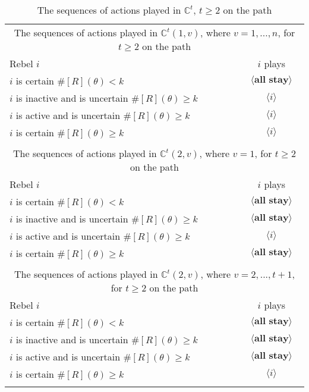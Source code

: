 \documentclass[12pt,letter]{article}
\newcommand{\Kappa}{\mathbb{C}}
\theoremstyle{definition}
\theoremstyle{definition}
\theoremstyle{remark}
\theoremstyle{claim}
\begin{document}
\begin{table}[!htbp]
\caption{The sequences of actions played in $\Kappa^t$, $t\geq 2$ on the path}
\label{Table_cdt}
\begin{center}
\begin{tabular}{l c}
\multicolumn{2}{c}{The sequences of actions played in $\Kappa^t(1,v)$, where $v=1,...,n$, for $t\geq 2$ on the path}\\
Rebel $i$ 	 	&  	$i$ plays		 \\
\hline
\hline
$i$ is certain $\#[R](\theta)<k$ 	& 	$\langle \textbf{all stay} \rangle$	\\
$i$ is inactive and is uncertain $\#[R](\theta)\geq k$	& 	$\langle i \rangle$	\\
$i$ is active and is uncertain $\#[R](\theta)\geq k$ &  $\langle i \rangle$  \\
$i$ is certain $\#[R](\theta)\geq k$ &  $\langle i \rangle$  \\
\hline
\\
\multicolumn{2}{c}{The sequences of actions played in $\Kappa^t(2,v)$, where $v=1$, for $t\geq 2$ on the path}\\
Rebel $i$ 	 	&  	$i$ plays		 \\
\hline
\hline
$i$ is certain $\#[R](\theta)<k$ 	& 	$\langle \textbf{all stay} \rangle$	\\
$i$ is inactive and is uncertain $\#[R](\theta)\geq k$	& 	$\langle \textbf{all stay} \rangle$	\\
$i$ is active and is uncertain $\#[R](\theta)\geq k$ &  $\langle i \rangle$  \\
$i$ is certain $\#[R](\theta)\geq k$ &  $\langle \textbf{all stay} \rangle$  \\
\hline
\\
\multicolumn{2}{c}{The sequences of actions played in $\Kappa^t(2,v)$, where $v=2,...,t+1$, for $t\geq 2$ on the path}\\
Rebel $i$ 	 	&  	$i$ plays		 \\
\hline
\hline
$i$ is certain $\#[R](\theta)<k$ 	& 	$\langle \textbf{all stay} \rangle$	\\
$i$ is inactive and is uncertain $\#[R](\theta)\geq k$	& 	$\langle \textbf{all stay} \rangle$	\\
$i$ is active and is uncertain $\#[R](\theta)\geq k$ &  $\langle \textbf{all stay} \rangle$  \\
$i$ is certain $\#[R](\theta)\geq k$ &  $\langle i \rangle$  \\
\hline
\\

\end{tabular}
\end{center}
\end{table}
\end{document}
